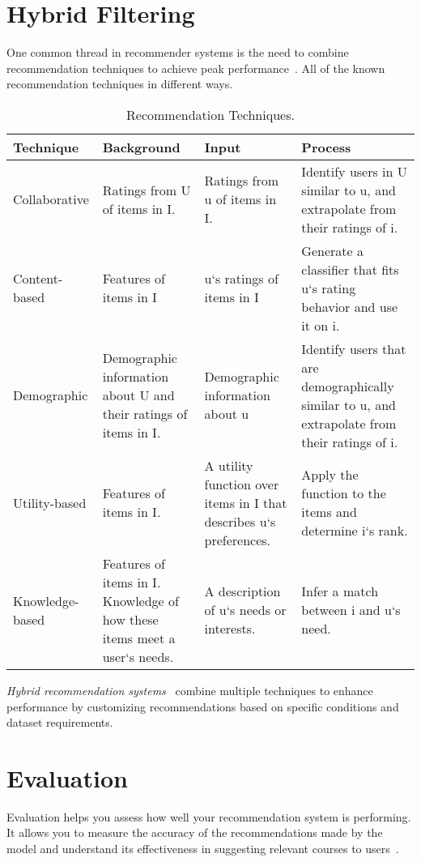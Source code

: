 \section{Hybrid Filtering}

One common thread in recommender systems is the need to combine recommendation techniques to 
achieve peak performance~\cite{Xiao2018}. All of the known recommendation techniques in different ways.

\begin{table}[H]
\center
\begin{tabular}{ p{3cm} p{3cm} p{3cm} p{3cm}  }
  \hline
  \textbf{Technique} &\textbf{Background} &\textbf{Input } &\textbf{Process} \\
  \hline
  Collaborative &Ratings from U of items in I. &Ratings from u of items in I. &Identify users in U similar to u, and extrapolate from their ratings of i. \\
  Content-based &Features of items in I   &u`s ratings of items in I &Generate a classifier that fits u`s rating behavior and use it on i. \\
  Demographic &Demographic information about U and their ratings of items in I. & Demographic information about u &Identify users that are demographically similar to u, and extrapolate from their ratings of i. \\
  Utility-based &Features of items in I. &A utility function over items in I that describes u`s preferences. &Apply the function to the items and determine i`s rank. \\
  Knowledge-based &Features of items in I. Knowledge of how these items meet a user`s needs. &A description of u`s needs or interests. &Infer a match between i and u`s need.\\
  \hline
\end{tabular}
\caption{Recommendation Techniques.}
\end{table}

\textit{Hybrid recommendation systems}~\cite{5628917} combine multiple techniques to enhance performance 
by customizing recommendations based on specific conditions and dataset requirements.

\section{Evaluation}

Evaluation helps you assess how well your recommendation system is performing. It 
allows you to measure the accuracy of the recommendations made by the model and 
understand its effectiveness in suggesting relevant courses to users~\cite{Lin2018}.

